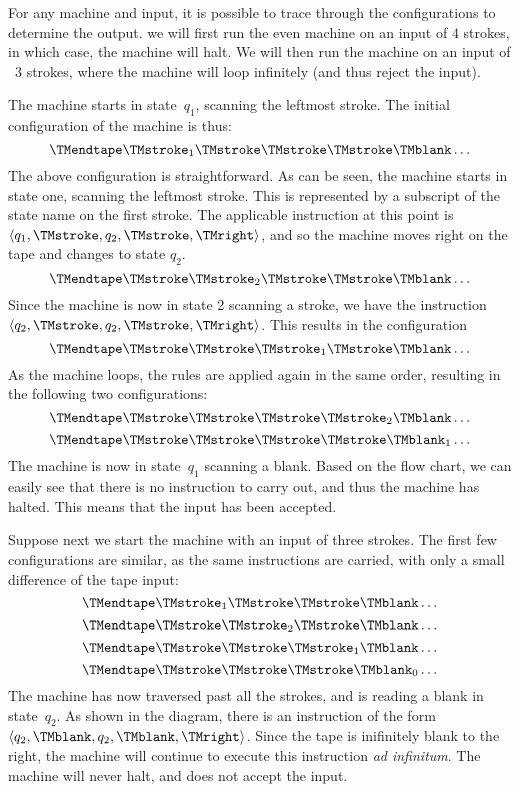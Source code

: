\documentclass[../../../include/open-logic-section]{subfiles}
\begin{document}
\begin{ex}
For any machine and input, it is possible to trace through the configurations
to determine the output. we will first run the even machine on an input of $4$ 
strokes, in which case, the machine will halt. We will then run the machine on 
an input of ~$3$ strokes, where the machine will loop infinitely (and thus reject
the input). 

The machine starts in state~$q_1$, scanning the leftmost stroke.
The initial configuration of the machine is thus:
\[
\TMendtape \TMstroke_1 \TMstroke \TMstroke \TMstroke \TMblank \ldots
\]
The above configuration is straightforward. As can be seen, the machine starts
in state one, scanning the leftmost stroke. This is represented by a subscript of
the state name on the first stroke. The applicable instruction at this point is $\langle
q_1, \TMstroke, q_2, \TMstroke, \TMright \rangle$, and so the machine moves
right on the tape and changes to state $q_2$.
\[
\TMendtape \TMstroke \TMstroke_2 \TMstroke \TMstroke \TMblank \ldots
\]
Since the machine is now in state 2 scanning a stroke, we have the instruction
$\langle q_2, \TMstroke, q_2, \TMstroke, \TMright \rangle$. This results in the
configuration
\[
\TMendtape \TMstroke \TMstroke \TMstroke_1 \TMstroke \TMblank \ldots
\]
As the machine loops, the rules are applied again in the same order, resulting
in the following two configurations:
\[
\TMendtape \TMstroke \TMstroke \TMstroke \TMstroke_2 \TMblank \ldots
\]
\[
\TMendtape \TMstroke \TMstroke \TMstroke \TMstroke \TMblank_1 \ldots
\]
The machine is now in state~$q_1$ scanning a blank. Based on the flow
chart, we can easily see that there is no instruction to carry out, and thus the
machine has halted. This means that the input has been accepted.

Suppose next we start the machine with an input of three strokes. The
first few configurations are similar, as the same instructions are carried, with
only a small difference of the tape input:
\[
\TMendtape \TMstroke_1 \TMstroke \TMstroke \TMblank \ldots
\]
\[
\TMendtape \TMstroke \TMstroke_2 \TMstroke \TMblank \ldots
\]
\[
\TMendtape \TMstroke \TMstroke \TMstroke_1 \TMblank \ldots
\]
\[
\TMendtape \TMstroke \TMstroke \TMstroke \TMblank_0 \ldots
\]
The machine has now traversed past all the strokes, and is reading
a blank in state~$q_2$. As shown in the diagram, there is an instruction
of the form $\langle q_2, \TMblank, q_2, \TMblank, \TMright \rangle$.
Since the tape is inifinitely blank to the right, the machine will continue to
execute this instruction \emph{ad infinitum}. The machine will never halt,
and does not accept the input.
\end{ex}
\end{document}
